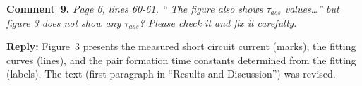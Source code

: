 \documentclass[sn-mathphys]{sn-jnl}
\begin{document}
\vspace{1cm}
\noindent
\textcolor[rgb]{0.00,0.50,1.00}{\textbf{Comment~9.}}
\emph{Page 6, lines 60-61, “ The figure also shows $\tau_{ass}$ values…” but figure 3 does not show any $\tau_{ass}$?
Please check it and fix it carefully.}

\noindent
\textcolor[rgb]{0.51,0.00,0.00}{\textbf{Reply:}}
Figure~3 presents the measured short circuit current (marks), the fitting curves (lines), and the pair formation time constants  determined from the fitting (labels).
The text (first paragraph in ``Results and Discussion'') was revised.




\end{document}
